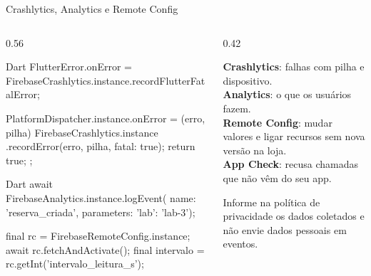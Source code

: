 \documentclass[aspectratio=169,10pt]{beamer}
\begin{document}
\begin{frame}[fragile]{Crashlytics, Analytics e Remote Config}
  \begin{columns}[T]
    \begin{column}{0.56\textwidth}
\begin{codigo}[title=main.dart: capturando falhas]{Dart}
FlutterError.onError =
    FirebaseCrashlytics.instance.recordFlutterFatalError;

PlatformDispatcher.instance.onError = (erro, pilha) {
  FirebaseCrashlytics.instance
      .recordError(erro, pilha, fatal: true);
  return true;
};
\end{codigo}
\begin{codigo}[title=Evento e configuração remota]{Dart}
await FirebaseAnalytics.instance.logEvent(
    name: 'reserva_criada', parameters: {'lab': 'lab-3'});

final rc = FirebaseRemoteConfig.instance;
await rc.fetchAndActivate();
final intervalo = rc.getInt('intervalo_leitura_s');
\end{codigo}
    \end{column}
    \begin{column}{0.42\textwidth}
      \begin{conceito}
        \textbf{Crashlytics}: falhas com pilha e dispositivo.\\
        \textbf{Analytics}: o que os usuários fazem.\\
        \textbf{Remote Config}: mudar valores e ligar recursos sem nova versão na loja.\\
        \textbf{App Check}: recusa chamadas que não vêm do seu app.
      \end{conceito}
      \begin{atencao}[LGPD]
        Informe na política de privacidade os dados coletados e não envie dados pessoais em eventos.
      \end{atencao}
    \end{column}
  \end{columns}
\end{frame}
\end{document}
